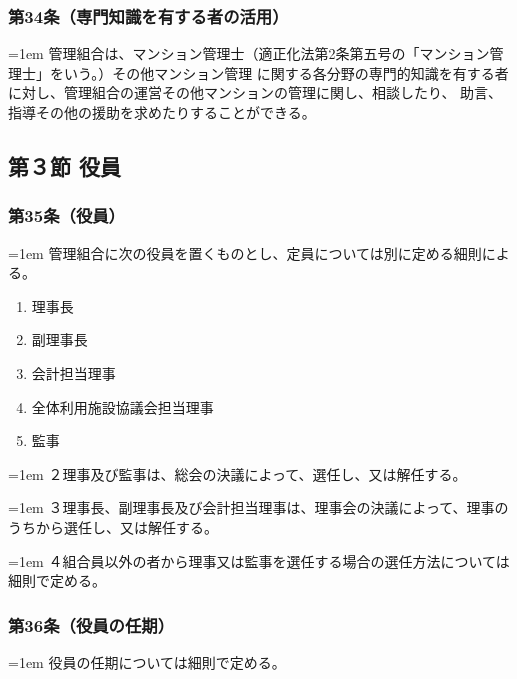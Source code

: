 \documentclass[
  twoside,
  luatex,
  paper=a4paper,
  fontsize=11pt,
  jafontsize=11pt,
  jlreq_notes,
]{jlreq}
\newcommand{\joumain}[1]{%
  \noindent\hangindent=1em\hangafter=1
  \hspace{1em}#1%
}
\newcommand{\kou}[2]{%
  \par\noindent\hangindent=1em\hangafter=1
  #1\hspace{1em}#2%
}
\begin{document}
  \subsubsection*{第34条（専門知識を有する者の活用）}
  \joumain{管理組合は、マンション管理士（適正化法第2条第五号の「マンション管理士」をいう。）その他マンション管理
  に関する各分野の専門的知識を有する者に対し、管理組合の運営その他マンションの管理に関し、相談したり、
  助言、指導その他の援助を求めたりすることができる。}
  
  \begin{center}
  \subsection*{第３節 役員}
  \end{center}

  \subsubsection*{第35条（役員）}
  \joumain{管理組合に次の役員を置くものとし、定員については別に定める細則による。}
  \begin{enumerate}
    \item 理事長
    \item 副理事長
    \item 会計担当理事
    \item 全体利用施設協議会担当理事
    \item 監事
  \end{enumerate}
  \kou{２}{理事及び監事は、総会の決議によって、選任し、又は解任する。}
  \kou{３}{理事長、副理事長及び会計担当理事は、理事会の決議によって、理事のうちから選任し、又は解任する。}
  \kou{４}{組合員以外の者から理事又は監事を選任する場合の選任方法については細則で定める。}

  \subsubsection*{第36条（役員の任期）}
  \joumain{役員の任期については細則で定める。}
  
\end{document}
